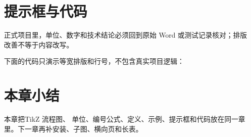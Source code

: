 \section{提示框与代码}

\begin{tcolorbox}[bookbox,title=课堂提示]
  正式项目里，单位、数字和技术结论必须回到原始 Word 或测试记录核对；排版改善不等于内容改写。
\end{tcolorbox}

下面的代码只演示等宽排版和行号，不包含真实项目逻辑：



\section{本章小结}

本章把TikZ 流程图、 单位、编号公式、定义、示例、提示框和代码放在同一章里。下一章再补安装、子图、横向页和长表。
